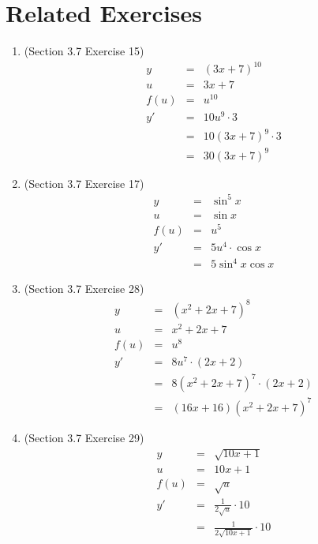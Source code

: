 \documentclass{article}
\begin{document}
\section*{Related Exercises}
\begin{enumerate}
    \item (Section 3.7 Exercise 15)
        \begin{eqnarray}
            y &=& \left(3x+7\right)^{10} \\
            u &=& 3x+7 \\
            f(u) &=& u^{10} \\
            y' &=& 10u^9 \cdot 3 \\
               &=& 10\left(3x+7\right)^9 \cdot 3 \\
               &=& 30\left(3x+7\right)^9
        \end{eqnarray}
    \item (Section 3.7 Exercise 17)
        \begin{eqnarray}
            y &=& \sin^5{x} \\
            u &=& \sin{x} \\
            f(u) &=& u^5 \\
            y' &=& 5u^4 \cdot \cos{x} \\
               &=& 5\sin^4{x} \cos{x}
        \end{eqnarray}
    \item (Section 3.7 Exercise 28)
        \begin{eqnarray}
            y &=& \left(x^2+2x+7\right)^8 \\
            u &=& x^2 + 2x + 7 \\
            f(u) &=& u^8 \\
            y' &=& 8u^7 \cdot (2x + 2) \\
               &=& 8\left(x^2+2x+7\right)^7 \cdot (2x + 2) \\
               &=& \left(16x + 16\right)\left(x^2+2x+7\right)^7
        \end{eqnarray}
    \item (Section 3.7 Exercise 29)
        \begin{eqnarray}
            y &=& \sqrt{10x + 1} \\
            u &=& 10x + 1 \\
            f(u) &=& \sqrt{u} \\
            y' &=& \frac{1}{2\sqrt{u}} \cdot 10 \\
               &=& \frac{1}{2\sqrt{10x + 1}} \cdot 10 \\

\end{eqnarray}
\end{enumerate}
\end{document}
